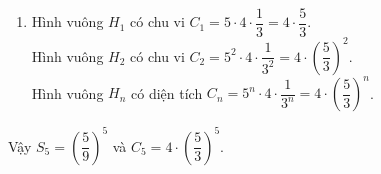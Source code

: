 \begin{ex}
{\begin{enumerate}
				\item Hình vuông $H_1$ có chu vi $C_1=5\cdot 4\cdot  \dfrac{1}{3}=4\cdot \dfrac{5}{3}$.\\
				Hình vuông $H_2$ có chu vi $C_2=5^2\cdot4\cdot \dfrac{1}{3^2}=4\cdot \left(\dfrac{5}{3}\right)^2$.\\
				Hình vuông $H_n$ có diện tích $C_n=5^n\cdot4\cdot  \dfrac{1}{3^n}=4\cdot \left(\dfrac{5}{3}\right)^n$.\\
				
			\end{enumerate}
			Vậy $S_5=\left(\dfrac{5}{9}\right)^5$ và $C_5=4\cdot \left(\dfrac{5}{3}\right)^5$.
		}
	\end{ex}
